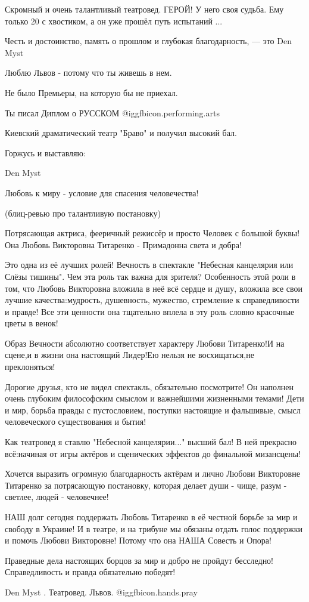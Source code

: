 Скромный и очень талантливый театровед. ГЕРОЙ!
У него своя судьба. Ему только 20 с хвостиком, 
а он уже прошёл путь испытаний ... 

Честь и достоинство, память о прошлом и 
глубокая благодарность, — это Den Myst

Люблю Львов - потому что ты живешь в нем. 

Не было Премьеры, на которую бы не приехал. 

Ты писал Диплом о РУССКОМ  @igg{fbicon.performing.arts} 

Киевский драматический театр "Браво" и получил высокий бал. 

Горжусь и выставляю:

Den Myst 

Любовь к миру - условие для спасения человечества!

(блиц-ревью про талантливую постановку)

Потрясающая актриса, фееричный режиссёр и просто Человек с большой буквы! Она
Любовь Викторовна Титаренко - Примадонна света и добра!

Это одна из её лучших ролей! Вечность в спектакле "Небесная канцелярия или Слёзы
тишины". Чем эта роль так важна для зрителя? Особенность этой роли в том, что
Любовь Викторовна вложила в неё всё сердце и душу, вложила все свои лучшие
качества:мудрость, душевность, мужество, стремление к справедливости и
правде! Все эти ценности она тщательно вплела в эту роль словно красочные цветы
в венок!

Образ Вечности абсолютно соответствует характеру Любови Титаренко!И на сцене,и
в жизни она настоящий Лидер!Ею нельзя не восхищаться,не преклоняться!

Дорогие друзья, кто не видел спектакль, обязательно посмотрите! Он наполнен очень
глубоким философским смыслом и важнейшими жизненными темами! Дети и мир, борьба
правды с пустословием, поступки настоящие и фальшивые, смысл человеческого
существования и бытия!

Как театровед я ставлю "Небесной канцелярии..." высший бал! В ней прекрасно
всё:начиная от игры актёров и сценических эффектов до финальной мизансцены!

Хочется выразить огромную благодарность актёрам и лично Любови Викторовне
Титаренко за потрясающую постановку, которая делает души -
чище, разум - светлее, людей - человечнее!

НАШ долг сегодня поддержать Любовь Титаренко в её честной борьбе за мир и
свободу в Украине! И в театре, и на трибуне мы обязаны отдать голос поддержки и
помочь Любови Викторовне! Потому что она НАША Совесть и Опора!

Праведные дела настоящих борцов за мир и добро не пройдут
бесследно! Справедливость и правда обязательно победят!

Den Myst . Театровед.  Львов. @igg{fbicon.hands.pray} 
